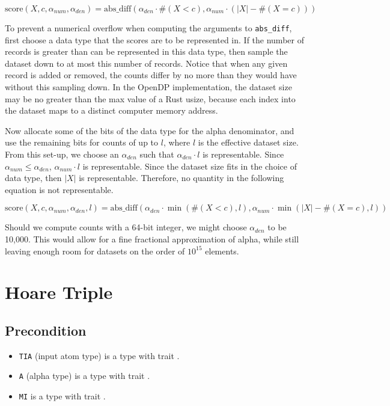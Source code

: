 \documentclass{article}
\begin{document}
\begin{equation}
    \textrm{score}(X, c, \alpha_{num}, \alpha_{den}) = \mathrm{abs\_diff}(\alpha_{den} \cdot \#(X < c), \alpha_{num} \cdot (|X| - \#(X = c)))
\end{equation}

To prevent a numerical overflow when computing the arguments to \texttt{abs\_diff}, 
first choose a data type that the scores are to be represented in.
If the number of records is greater than can be represented in this data type, 
then sample the dataset down to at most this number of records.
Notice that when any given record is added or removed, 
the counts differ by no more than they would have without this sampling down.
In the OpenDP implementation, the dataset size may be no greater than the max value of a Rust usize, 
because each index into the dataset maps to a distinct computer memory address.

Now allocate some of the bits of the data type for the alpha denominator,
and use the remaining bits for counts of up to $l$, where $l$ is the effective dataset size.
From this set-up, we choose an $\alpha_{den}$ such that $\alpha_{den} \cdot l$ is representable.
Since $\alpha_{num} \le \alpha_{den}$, $\alpha_{num} \cdot l$ is representable.
Since the dataset size fits in the choice of data type, then $|X|$ is representable.
Therefore, no quantity in the following equation is not representable.

\begin{equation}
    \textrm{score}(X, c, \alpha_{num}, \alpha_{den}, l) = \mathrm{abs\_diff}(\alpha_{den} \cdot \min(\#(X < c), l), \alpha_{num} \cdot \min(|X| - \#(X = c), l))
\end{equation}

Should we compute counts with a 64-bit integer, we might choose $\alpha_{den}$ to be 10,000.
This would allow for a fine fractional approximation of alpha,
while still leaving enough room for datasets on the order of $10^{15}$ elements.

\section{Hoare Triple}
\subsection*{Precondition}
\begin{itemize}
    \item \texttt{TIA} (input atom type) is a type with trait .
    \item \texttt{A} (alpha type) is a type with trait .
    \item \texttt{MI} is a type with trait .
\end{itemize}
\end{document}
